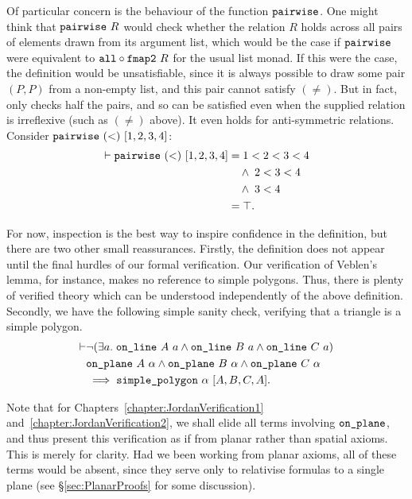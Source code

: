 Of particular concern is the behaviour of the function $\texttt{pairwise}$. One might think that $\texttt{pairwise}\ R$ would check whether the relation $R$ holds across all pairs of elements drawn from its argument list, which would be the case if $\texttt{pairwise}$ were equivalent to $\texttt{all} \circ \texttt{fmap2}\ R$ for the usual list monad. If this were the case, the definition would be unsatisfiable, since it is always possible to draw some pair $(P,P)$ from a non-empty list, and this pair cannot satisfy $(\neq)$. But in fact,  only checks half the pairs, and so can be satisfied even when the supplied relation is irreflexive (such as $(\neq)$ above). It even holds for anti-symmetric relations. Consider $\texttt{pairwise}\ (<)\ [1,2,3,4]$:
\begingroup
\allowdisplaybreaks
\begin{align*}
  \vdash\texttt{pairwise}\ (<)\ [1,2,3,4] &= 1 < 2 < 3 < 4 \\
  &\quad\wedge\; 2 < 3 < 4 \\
  &\quad\wedge\; 3 < 4\\
  & = \top.
\end{align*}
\endgroup

For now, inspection is the best way to inspire confidence in the definition, but there are two other small reassurances. Firstly, the definition does not appear until the final hurdles of our formal verification. Our verification of Veblen's lemma, for instance, makes no reference to simple polygons. Thus, there is plenty of verified theory which can be understood independently of the above definition. Secondly, we have the following simple sanity check, verifying that a triangle is a simple polygon.
\begin{equation*}
  \begin{split}
    \vdash&\Triangle{a}{A}{B}{C}\\
    &\code{on\_plane}\ A\ \alpha\wedge\code{on\_plane}\ B\ \alpha\wedge\code{on\_plane}\ C\ \alpha\\
    &\implies \code{simple\_polygon}\ \alpha\ [A,B,C,A].
  \end{split}
\end{equation*}

Note that for Chapters~\ref{chapter:JordanVerification1} and~\ref{chapter:JordanVerification2}, we shall elide all terms involving $\texttt{on\_plane}$, and thus present this verification as if from planar rather than spatial axioms. This is merely for clarity. Had we been working from planar axioms, all of these terms would be absent, since they serve only to relativise formulas to a single plane (see \S\ref{sec:PlanarProofs} for some discussion).


